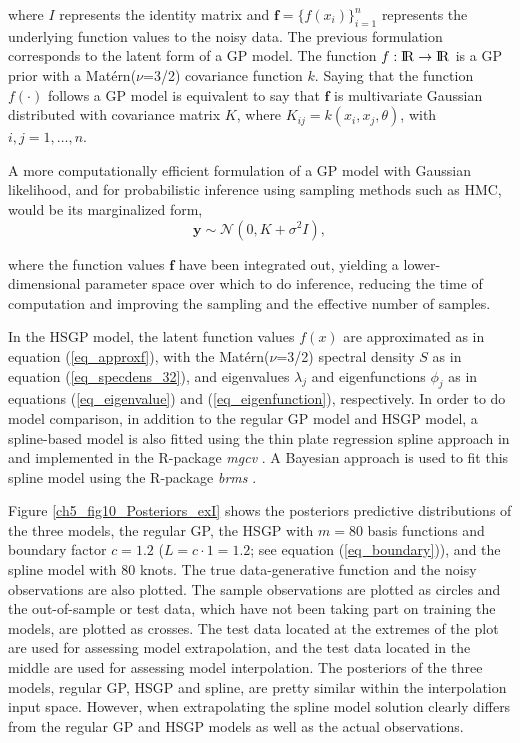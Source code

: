 \documentclass[onecolumn,a4paper,11pt]{article}
\begin{document}
\noindent where $I$ represents the identity matrix and $\bm{f}=\{f(x_i)\}_{i=1}^n$ represents the underlying function values to the noisy data. The previous formulation corresponds to the latent form of a GP model. The function $f:{\rm I\!R} \to {\rm I\!R}$ is a GP prior with a Mat{\'e}rn($\nu$=3/2) covariance function $k$. Saying that the function $f(\cdot)$ follows a GP model is equivalent to say that $\bm{f}$ is multivariate Gaussian distributed with covariance matrix $K$, where $K_{ij}=k(x_i,x_j,\theta)$, with $i,j=1,\dots,n$.
 
A more computationally efficient formulation of a GP model with Gaussian likelihood, and for probabilistic inference using sampling methods such as HMC, would be its marginalized form,
%
\begin{equation*}\label{ch5_eq_marginalizedgp_simudata1}
\bm{y} \sim \mathcal{N}(0, K + \sigma^2 I ),
\end{equation*}

\noindent where the function values $\bm{f}$ have been integrated out, yielding a lower-dimensional parameter space over which to do inference, reducing the time of computation and improving the sampling and the effective number of samples.

In the HSGP model, the latent function values $f(x)$ are approximated as in equation (\ref{eq_approxf}), with the Mat{\'e}rn($\nu$=3/2) spectral density $S$ as in equation (\ref{eq_specdens_32}), and eigenvalues $\lambda_j$ and eigenfunctions $\phi_j$ as in equations (\ref{eq_eigenvalue}) and (\ref{eq_eigenfunction}), respectively. 
In order to do model comparison, in addition to the regular GP model and HSGP model, a spline-based model is also fitted using the thin plate regression spline approach in \cite{wood2003thin} and implemented in the R-package \textit{mgcv} \citep{wood2011mgcv}. A Bayesian approach is used to fit this spline model using the R-package \textit{brms} \citep{burkner2017brms}.

Figure \ref{ch5_fig10_Posteriors_exI} shows the posteriors predictive distributions of the three models, the regular GP, the HSGP with $m=80$ basis functions and boundary factor $c=1.2$ ($L=c\cdot 1= 1.2$; see equation (\ref{eq_boundary})), and the spline model with 80 knots. The true data-generative function and the noisy observations are also plotted. The sample observations are plotted as circles and the out-of-sample or test data, which have not been taking part on training the models, are plotted as crosses. The test data located at the extremes of the plot are used for assessing model extrapolation, and the test data located in the middle are used for assessing model interpolation. The posteriors of the three models, regular GP, HSGP and spline, are pretty similar within the interpolation input space. However, when extrapolating the spline model solution clearly differs from the regular GP and HSGP models as well as the actual observations. 
\end{document}
